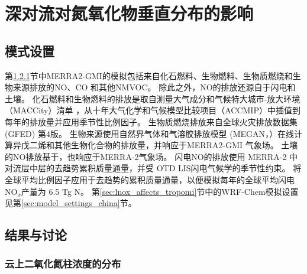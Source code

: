 
\chapter{深对流对氮氧化物垂直分布的影响}

\section{模式设置} \label{sec:model_settings_gmi}

第\ref{sec:no2_vcd_cld}节中MERRA2-GMI的模拟包括来自化石燃料、生物燃料、生物质燃烧和生物来源排放的NO、CO 和其他NMVOC。
除此之外，NO的排放还源自于闪电和土壤。
化石燃料和生物燃料的排放是取自测量大气成分和气候特大城市-放大环境（MACCity）清单\citep{Granier.2011}
，从十年大气化学和气候模型比较项目（ACCMIP）中插值到每年的排放量并应用季节性比例因子\citep{Lamarque.2010}。
生物质燃烧排放来自全球火灾排放数据集 (GFED) 第4版\citep{Giglio.2013}。
生物来源使用自然界气体和气溶胶排放模型 (MEGAN，\citet{Guenther.1999}）在线计算异戊二烯和其他生物化合物的排放量，并响应于MERRA2-GMI 气象场。
土壤的NO排放基于\citet{Yienger.1995}，也响应于MERRA-2气象场。
闪电NO的排放使用 MERRA-2 中对流层中层的去趋势累积质量通量\citep{Allen.2010}，并受 OTD LIS闪电气候学的季节性约束\citep{Cecil.2014}。
将全球平均比例因子应用于去趋势的累积质量通量，以便模拟每年的全球平均闪电 NO$_x$产量为 6.5 Tg N。
第\ref{sec:lnox_affects_tropomi}节中的WRF-Chem模拟设置见第\ref{sec:model_settings_china}节。




\section{结果与讨论}

\subsection{云上二氧化氮柱浓度的分布} \label{sec:no2_vcd_cld}

